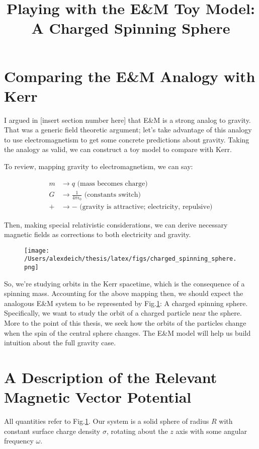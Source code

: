 \documentclass[11pt]{article}
\title{Playing with the E\&M Toy Model:\\A Charged Spinning Sphere}
\date{}                                           %
\begin{document}
\maketitle
\section{Comparing the E\&M Analogy with Kerr}
I argued in [insert section number here] that E\&M is a strong analog to gravity.  That was a generic field theoretic argument; let's take advantage of this analogy to use electromagnetism to get some concrete predictions about gravity.  Taking the analogy as valid, we can construct a toy model to compare with Kerr.

To review, mapping gravity to electromagnetism, we can say:

\begin{align}
m &\rightarrow q   \text{ (mass becomes charge)}\\
G &\rightarrow \frac{1}{4\pi\epsilon_0} \text{ (constants switch)}\\
+ &\rightarrow - \text{ (gravity is attractive; electricity, repulsive)}
\end{align}

Then, making special relativistic considerations, we can derive necessary magnetic fields as corrections to both electricity and gravity.
\begin{figure}[h]
  \begin{center}
    \texttt{[image: /Users/alexdeich/thesis/latex/figs/charged\_spinning\_sphere.png]}
  \end{center}
  \caption{}
  \label{fig:charged_spinning_sphere}
\end{figure}

So, we're studying orbits in the Kerr spacetime, which is the consequence of a spinning mass.  Accounting for the above mapping then, we should expect the analogous E\&M system to be represented by Fig.\ref{fig:charged_spinning_sphere}:  A charged spinning sphere.  Specifically, we want to study the orbit of a charged particle near the sphere.  More to the point of this thesis, we seek how the orbits of the particles change when the spin of the central sphere changes.  The E\&M model will help us build intuition about the full gravity case.

\section{A Description of the Relevant Magnetic Vector Potential}
All quantities refer to Fig.\ref{fig:charged_spinning_sphere}.  Our system is a solid sphere of radius $R$ with constant surface charge density $\sigma$, rotating about the $z$ axis with some angular frequency $\omega$.
\end{document}
